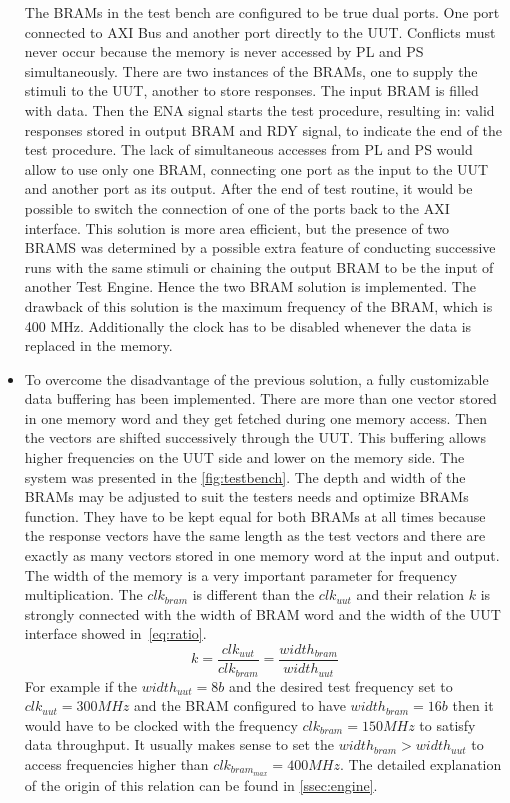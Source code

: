 \begin{itemize}
    The BRAMs in the test bench are configured to be true dual ports. One port connected to AXI Bus and another port directly to the UUT. Conflicts must never occur because the memory is never accessed by PL and PS simultaneously. There are two instances of the BRAMs, one to supply the stimuli to the UUT, another to store responses. The input BRAM is filled with data. Then the ENA signal starts the test procedure, resulting in: valid responses stored in output BRAM and RDY signal, to indicate the end of the test procedure. The lack of simultaneous accesses from PL and PS would allow to use only one BRAM, connecting one port as the input to the UUT and another port as its output. After the end of test routine, it would be possible to switch the connection of one of the ports back to the AXI interface. This solution is more area efficient, but the presence of two BRAMS was determined by a possible extra feature of conducting successive runs with the same stimuli or chaining the output BRAM to be the input of another Test Engine. Hence the two BRAM solution is implemented.
    The drawback of this solution is the maximum frequency of the BRAM, which is 400 MHz. Additionally the clock has to be disabled whenever the data is replaced in the memory.
    \item To overcome the disadvantage of the previous solution, a fully customizable data buffering has been implemented. There are more than one vector stored in one memory word and they get fetched during one memory access. Then the vectors are shifted successively through the UUT. This buffering allows higher frequencies on the UUT side and lower on the memory side. The system was presented in the \autoref{fig:testbench}.
    The depth and width of the BRAMs may be adjusted to suit the testers needs and optimize BRAMs function. They have to be kept equal for both BRAMs at all times because the response vectors have the same length as the test vectors and there are exactly as many vectors stored in one memory word at the input and output. The width of the memory is a very important parameter for frequency multiplication. The $clk_{bram}$ is different than the $clk_{uut}$ and their relation $k$ is strongly connected with the width of BRAM word and the width of the UUT interface showed in~\autoref{eq:ratio}. 
    \begin{equation}
    k = \frac{clk_{uut}}{clk_{bram}} = \frac{width_{bram}}{width_{uut}}\label{eq:ratio}
    \end{equation}
    For example if the $width_{uut} = 8b$ and the desired test frequency set to $clk_{uut} = 300MHz$ and the BRAM configured to have $width_{bram} = 16b$ then it would have to be clocked with the frequency $clk_{bram} = 150MHz$ to satisfy data throughput. It usually makes sense to set the $width_{bram} > width_{uut}$ to access frequencies higher than $clk_{bram_{max}} = 400 MHz$. The detailed explanation of the origin of this relation can be found in \autoref{ssec:engine}.
\end{itemize}

